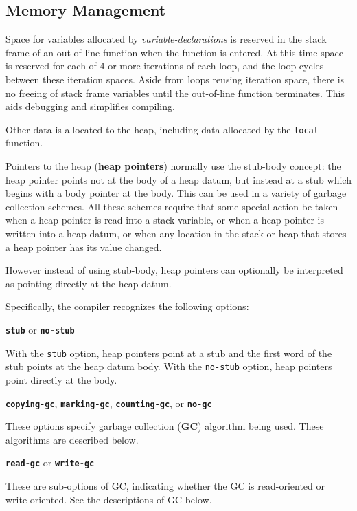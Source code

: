 \documentclass[12pt]{article}
\newcommand{\key}[1]{{\rm \bfseries #1}}
\newcommand{\ttkey}[1]{{\tt \bfseries #1}}
\newcommand{\skey}[2]{{\rm \bfseries #1#2}}
\newenvironment{indpar}[1][0.3in]%
	{\begin{list}{}%
		     {\setlength{\itemsep}{0in}%
		      \setlength{\topsep}{0in}%
		      \setlength{\parsep}{1ex}%
		      \setlength{\labelwidth}{#1}%
		      \setlength{\leftmargin}{#1}%
		      \addtolength{\leftmargin}{\labelsep}}%
	 \item}%
	{\end{list}}
\begin{document}
\subsection{Memory Management}
\label{MEMORY-MANAGEMENT}

Space for variables allocated by {\em variable-declarations}
is reserved in the stack frame of an out-of-line function when the
function is entered.  At this
time space is reserved for each of 4 or more iterations of
each loop, and the loop cycles between these iteration spaces.
Aside from loops reusing iteration space, there is no
freeing of stack frame variables until the out-of-line function
terminates.  This aids debugging and simplifies compiling.

Other data is allocated to the heap, including data allocated
by the {\tt local} function.

Pointers to the heap (\skey{heap pointer}s) normally use the stub-body concept:
the heap pointer points not at the body of a heap datum, but instead at a
stub which begins with a body pointer at the body.  This can be
used in a variety of garbage collection schemes.  All these
schemes require that some special action be taken when a heap
pointer is read into a stack variable, or when
a heap pointer is written into a heap datum, or when any location
in the stack or heap that stores a heap pointer has its value
changed.

However instead of using stub-body, heap pointers can optionally be
interpreted as pointing directly at the heap datum.

Specifically, the compiler recognizes the following options:

\begin{indpar}

\ttkey{stub} or \ttkey{no-stub}
\begin{indpar}
With the {\tt stub} option, heap pointers point at a stub and the
first word of the stub points at the heap datum body.  With the
{\tt no-stub} option, heap pointers point directly at the body.
\end{indpar}

\ttkey{copying-gc}, \ttkey{marking-gc}, \ttkey{counting-gc}, or \ttkey{no-gc}
\begin{indpar}
These options specify garbage collection (\key{GC})
algorithm being used.  These algorithms are described below.
\end{indpar}

\ttkey{read-gc} or \ttkey{write-gc}
\begin{indpar}
These are sub-options of GC, indicating whether the GC is
read-oriented or write-oriented.  See the descriptions
of GC below.
\end{indpar}

\end{indpar}
\end{document}
